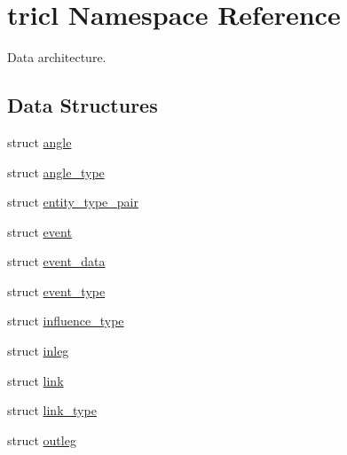 \hypertarget{namespacetricl}{}\section{tricl Namespace Reference}
\label{namespacetricl}


Data architecture.  


\subsection*{Data Structures}
\begin{DoxyCompactItemize}
\item 
struct \hyperlink{structtricl_1_1angle}{angle}
\item 
struct \hyperlink{structtricl_1_1angle__type}{angle\+\_\+type}
\item 
struct \hyperlink{structtricl_1_1entity__type__pair}{entity\+\_\+type\+\_\+pair}
\item 
struct \hyperlink{structtricl_1_1event}{event}
\item 
struct \hyperlink{structtricl_1_1event__data}{event\+\_\+data}
\item 
struct \hyperlink{structtricl_1_1event__type}{event\+\_\+type}
\item 
struct \hyperlink{structtricl_1_1influence__type}{influence\+\_\+type}
\item 
struct \hyperlink{structtricl_1_1inleg}{inleg}
\item 
struct \hyperlink{structtricl_1_1link}{link}
\item 
struct \hyperlink{structtricl_1_1link__type}{link\+\_\+type}
\item 
struct \hyperlink{structtricl_1_1outleg}{outleg}
\end{DoxyCompactItemize}
